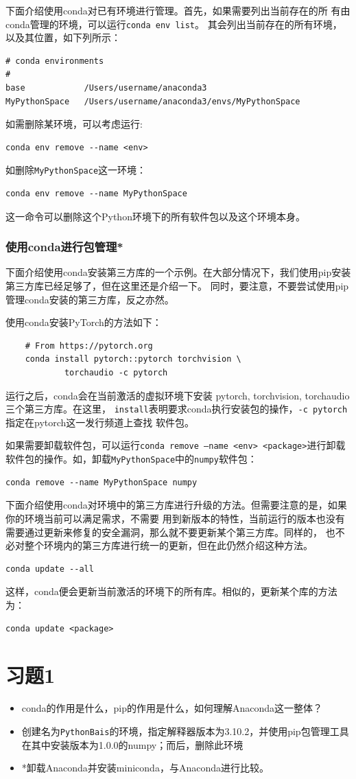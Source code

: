 下面介绍使用conda对已有环境进行管理。首先，如果需要列出当前存在的所
有由conda管理的环境，可以运行\texttt{conda env list}。
其会列出当前存在的所有环境，以及其位置，如下列所示：
\begin{lstlisting}
# conda environments
#
base            /Users/username/anaconda3
MyPythonSpace   /Users/username/anaconda3/envs/MyPythonSpace
\end{lstlisting}
如需删除某环境，可以考虑运行:
\begin{lstlisting}
conda env remove --name <env>
\end{lstlisting}
如删除\texttt{MyPythonSpace}这一环境：
\begin{lstlisting}
conda env remove --name MyPythonSpace
\end{lstlisting}
这一命令可以删除这个Python环境下的所有软件包以及这个环境本身。

\subsubsection{使用conda进行包管理*}
下面介绍使用conda安装第三方库的一个示例。在大部分情况下，我们使用pip安装第三方库已经足够了，但在这里还是介绍一下。
同时，要注意，不要尝试使用pip管理conda安装的第三方库，反之亦然。

使用conda安装PyTorch的方法如下：
\begin{lstlisting}
    # From https://pytorch.org
    conda install pytorch::pytorch torchvision \
            torchaudio -c pytorch
\end{lstlisting}
运行之后，conda会在当前激活的虚拟环境下安装 pytorch, torchvision, torchaudio 三个第三方库。在这里，
\texttt{install}表明要求conda执行安装包的操作，\texttt{-c pytorch}指定在pytorch这一发行频道上查找
软件包。

如果需要卸载软件包，可以运行\texttt{conda remove --name <env> <package>}进行卸载软件包的操作。如，卸载\texttt{MyPythonSpace}中的\texttt{numpy}软件包：
\begin{lstlisting}
conda remove --name MyPythonSpace numpy
\end{lstlisting}

下面介绍使用conda对环境中的第三方库进行升级的方法。但需要注意的是，如果你的环境当前可以满足需求，不需要
用到新版本的特性，当前运行的版本也没有需要通过更新来修复的安全漏洞，那么就不要更新某个第三方库。同样的，
也不必对整个环境内的第三方库进行统一的更新，但在此仍然介绍这种方法。
\begin{lstlisting}
conda update --all
\end{lstlisting}
这样，conda便会更新当前激活的环境下的所有库。相似的，更新某个库的方法为：
\begin{lstlisting}
conda update <package>
\end{lstlisting}
\newpage
\section*{习题1}
\begin{itemize}
    \item conda的作用是什么，pip的作用是什么，如何理解Anaconda这一整体？
    \item 创建名为\texttt{PythonBais}的环境，指定解释器版本为3.10.2，并使用pip包管理工具在其中安装版本为1.0.0的numpy；而后，删除此环境
    \item *卸载Anaconda并安装miniconda，与Anaconda进行比较。
\end{itemize}